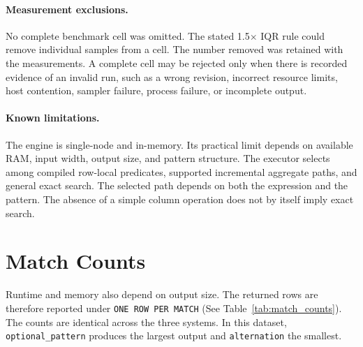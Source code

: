 \paragraph{Measurement exclusions.}
No complete benchmark cell was omitted.  The stated 1.5$\times$ IQR
rule could remove individual samples from a cell.  The number removed
was retained with the measurements.  A complete cell may be rejected
only when there is recorded evidence of an invalid run, such as a
wrong revision, incorrect resource limits, host contention, sampler
failure, process failure, or incomplete output.

\paragraph{Known limitations.}
The engine is single-node and in-memory.  Its practical limit depends
on available RAM, input width, output size, and pattern structure.
The executor selects among compiled row-local predicates, supported
incremental aggregate paths, and general exact search.  The selected
path depends on both the expression and the pattern.  The absence of a
simple column operation does not by itself imply exact search.

\section{Match Counts}
\label{app:match-counts}

Runtime and memory also depend on output size.
The returned rows are therefore reported under \texttt{ONE ROW PER MATCH}
(See Table~\ref{tab:match_counts}).  The counts are identical across the
three
systems.  In this dataset, \texttt{optional\_pattern} produces the
largest output and \texttt{alternation} the smallest.

{\small
\begin{table}[H]
\centering
\caption{Returned rows by pattern and size under \texttt{ONE ROW PER MATCH}}
\label{tab:match_counts}
\end{table}
}

